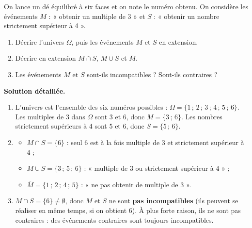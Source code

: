 \documentclass[11pt]{article}
\begin{document}
\begin{exoresolu}
On lance un dé équilibré à six faces et on note le numéro obtenu. On considère les événements $M$ : « obtenir un multiple de 3 » et $S$ : « obtenir un nombre strictement supérieur à 4 ».
\begin{enumerate}
\item Décrire l'univers $\Omega$, puis les événements $M$ et $S$ en extension.
\item Décrire en extension $M \cap S$, $M \cup S$ et $\bar{M}$.
\item Les événements $M$ et $S$ sont-ils incompatibles ? Sont-ils contraires ?
\end{enumerate}
\tcblower
\textbf{Solution détaillée.}
\begin{enumerate}
\item L'univers est l'ensemble des six numéros possibles : $\Omega = \{1\,;\,2\,;\,3\,;\,4\,;\,5\,;\,6\}$. Les multiples de 3 dans $\Omega$ sont 3 et 6, donc $M = \{3\,;\,6\}$. Les nombres strictement supérieurs à 4 sont 5 et 6, donc $S = \{5\,;\,6\}$.
\item \begin{itemize}
\item $M \cap S = \{6\}$ : seul 6 est à la fois multiple de 3 et strictement supérieur à 4 ;
\item $M \cup S = \{3\,;\,5\,;\,6\}$ : « multiple de 3 ou strictement supérieur à 4 » ;
\item $\bar{M} = \{1\,;\,2\,;\,4\,;\,5\}$ : « ne pas obtenir de multiple de 3 ».
\end{itemize}
\item $M \cap S = \{6\} \neq \emptyset$, donc $M$ et $S$ ne sont \textbf{pas incompatibles} (ils peuvent se réaliser en même temps, si on obtient 6). À plus forte raison, ils ne sont pas contraires : des événements contraires sont toujours incompatibles.
\end{enumerate}
\end{exoresolu}
\end{document}
